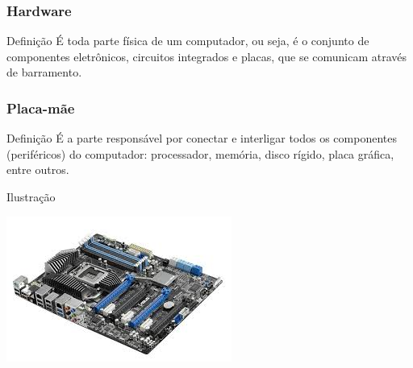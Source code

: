 \documentclass[aspectratio=169]{beamer} %
\begin{document}
\begin{frame}
	\frametitle{Hardware}
	
	\begin{block}{Defini\c cão}
		É toda parte física de um computador, ou seja, é o conjunto de componentes eletrônicos, circuitos integrados e placas, que se comunicam através de barramento.
	\end{block}
\end{frame}

\begin{frame}
	\frametitle{Placa-mãe}
	
	\begin{block}{Defini\c cão}
		É a parte responsável por conectar e interligar todos os componentes (periféricos) do computador: processador, memória, disco rígido, placa gráfica, entre outros.
	\end{block}\vfill
	
	\begin{exampleblock}{Ilustra\c cão}
		\begin{center}
			\includegraphics[scale=0.4]{img/placa-mae}
		\end{center}			
	\end{exampleblock}
\end{frame}
\end{document}
